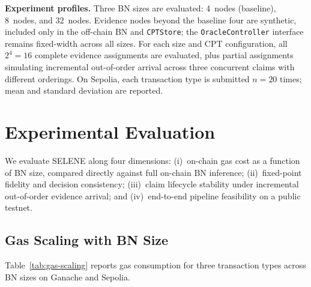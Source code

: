 \documentclass[journal]{IEEEtran}
\begin{document}
\textbf{Experiment profiles.}
Three BN sizes are evaluated: 4~nodes (baseline),
8~nodes, and 32~nodes. Evidence nodes beyond the
baseline four are synthetic, included only in the
off-chain BN and \texttt{CPTStore}; the
\texttt{OracleController} interface remains
fixed-width across all sizes. For each size and CPT
configuration, all $2^4=16$ complete evidence
assignments are evaluated, plus partial assignments
simulating incremental out-of-order arrival across
three concurrent claims with different orderings.
On Sepolia, each transaction type is submitted
$n=20$ times; mean and standard deviation are
reported.


\section{Experimental Evaluation}
\label{sec:experimental-analysis}

We evaluate SELENE along four dimensions:
(i)~on-chain gas cost as a function of BN size,
compared directly against full on-chain BN inference;
(ii)~fixed-point fidelity and decision consistency;
(iii)~claim lifecycle stability under incremental
out-of-order evidence arrival; and
(iv)~end-to-end pipeline feasibility on a public
testnet.

\subsection{Gas Scaling with BN Size}
\label{sec:exp-bn-size}

Table~\ref{tab:gas-scaling} reports gas consumption
for three transaction types across BN sizes on Ganache
and Sepolia.
\end{document}
